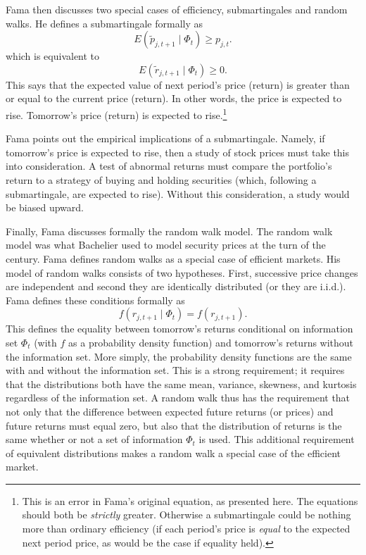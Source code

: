 Fama then discusses two special cases of efficiency,
submartingales and random walks. He defines a submartingale
formally
as
\begin{equation}
E(\tilde p_{j,t+1} \mid \Phi_{t}) \geq p_{j,t}.
\end{equation}
which is equivalent to
\begin{equation}
E(\tilde r_{j,t+1} \mid \Phi_{t}) \geq 0.
\end{equation}
This says that the expected value of next period's price (return) 
is greater than or equal to the current price (return).  In
other words, the price is expected to rise.  Tomorrow's price
(return) is expected to rise.\footnote{This is an error in
Fama's original equation, as presented here.  The equations
should both be {\em strictly} greater.  Otherwise a
submartingale could be nothing more than ordinary efficiency
(if each period's price is {\em equal} to the expected next
period price, as would be the case if equality held).}

Fama points out the empirical implications of a submartingale.
Namely, if tomorrow's price is expected to rise, then a study
of
stock prices must take this into consideration.  A test of abnormal
returns must compare the portfolio's return to a strategy of buying
and holding securities (which, following a submartingale, are
expected
to rise).  Without this consideration, a study would be biased
upward.

Finally, Fama discusses formally the random walk model.  The
random walk model was what Bachelier used to model security
prices at the turn of the century.  Fama defines random
walks as a special case of efficient markets.  His model of
random walks consists of two hypotheses.
First, successive price
changes are independent and second they are identically
distributed (or they are i.i.d.).  Fama defines these conditions
formally as
\begin{equation}
f(r_{j,t+1} \mid \Phi_{t})=f(r_{j,t+1}).
\end{equation}
This defines the equality between tomorrow's returns conditional on
information set $\Phi_{t}$
(with $f$ as a probability density function) and
tomorrow's returns without the information set.  More simply, the
probability density functions are the same with and without the
information set.  This is a strong requirement; it requires that
the
distributions both have the same mean, variance, skewness, and
kurtosis  regardless of the information set.
A random walk thus has the requirement that not only that the
difference between expected future returns (or prices) and future
returns must equal zero, but also that the distribution of returns
is
the same whether or not a set of information $\Phi_{t}$ is used. 
This
additional requirement of equivalent distributions makes a random
walk a special case of the efficient market.

